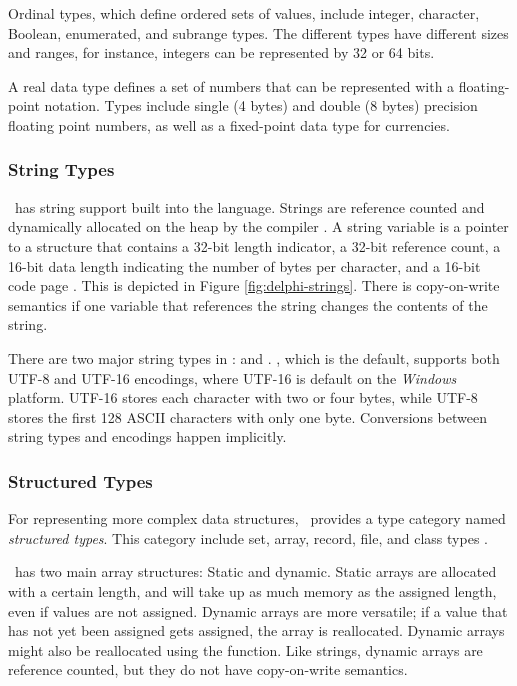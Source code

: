 Ordinal types, which define ordered sets of values, include integer, character, Boolean, enumerated, and subrange types. The different types have different sizes and ranges, for instance, integers can be represented by 32 or 64 bits.

A real data type defines a set of numbers that can be represented with a floating-point notation. Types include single (4 bytes) and double (8 bytes) precision floating point numbers, as well as a fixed-point data type for currencies.

\subsubsection{String Types}
\label{ssub:String Types}
\delphi~has string support built into the language. Strings are reference counted and dynamically allocated on the heap by the compiler \cite{Wikipedia_contributors2016-jk}. A string variable is a pointer to a structure that contains a 32-bit length indicator, a 32-bit reference count, a 16-bit data length indicating the number of bytes per character, and a 16-bit code page \cite{noauthor_undated-cp}. This is depicted in Figure \ref{fig:delphi-strings}. There is copy-on-write semantics if one variable that references the string changes the contents of the string.

There are two major string types in \delphi:  and . , which is the default, supports both UTF-8 and UTF-16 encodings, where UTF-16 is default on the \textit{Windows} platform. UTF-16 stores each character with two or four bytes, while UTF-8 stores the first 128 ASCII characters with only one byte. Conversions between string types and encodings happen implicitly.

\subsubsection{Structured Types}
\label{ssub:Structured Types}
For representing more complex data structures, \delphi~provides a type category named \textit{structured types}. This category include set, array, record, file, and class types \cite{noauthor_undated-vu}.

\delphi~has two main array structures: Static and dynamic. Static arrays are allocated with a certain length, and will take up as much memory as the assigned length, even if values are not assigned. Dynamic arrays are more versatile; if a value that has not yet been assigned gets assigned, the array is reallocated. Dynamic arrays might also be reallocated using the  function. Like strings, dynamic arrays are reference counted, but they do not have copy-on-write semantics.

